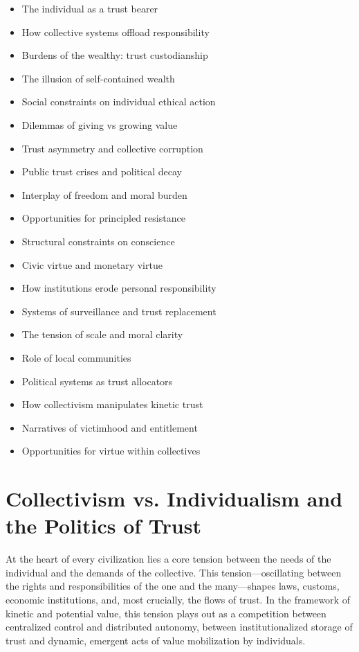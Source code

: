 \documentclass[11pt,oneside]{book}
\begin{document}
\begin{itemize}
\item The individual as a trust bearer
\item How collective systems offload responsibility
\item Burdens of the wealthy: trust custodianship
\item The illusion of self-contained wealth
\item Social constraints on individual ethical action
\item Dilemmas of giving vs growing value
\item Trust asymmetry and collective corruption
\item Public trust crises and political decay
\item Interplay of freedom and moral burden
\item Opportunities for principled resistance
\item Structural constraints on conscience
\item Civic virtue and monetary virtue
\item How institutions erode personal responsibility
\item Systems of surveillance and trust replacement
\item The tension of scale and moral clarity
\item Role of local communities
\item Political systems as trust allocators
\item How collectivism manipulates kinetic trust
\item Narratives of victimhood and entitlement
\item Opportunities for virtue within collectives
\end{itemize}

\section{Collectivism vs. Individualism and the Politics of Trust}

At the heart of every civilization lies a core tension between the needs of the individual and the demands of the collective. This tension—oscillating between the rights and responsibilities of the one and the many—shapes laws, customs, economic institutions, and, most crucially, the flows of trust. In the framework of kinetic and potential value, this tension plays out as a competition between centralized control and distributed autonomy, between institutionalized storage of trust and dynamic, emergent acts of value mobilization by individuals.
\end{document}
